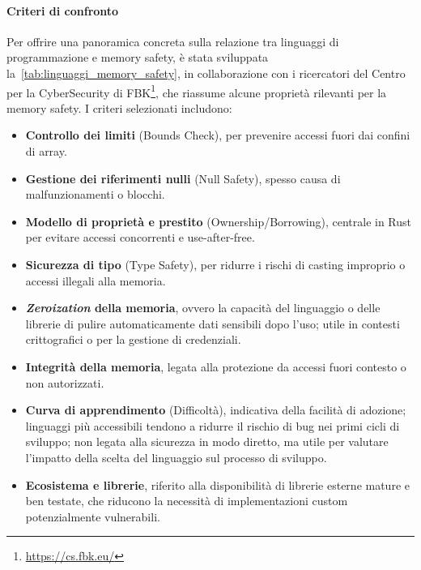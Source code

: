 \paragraph{Criteri di confronto}
Per offrire una panoramica concreta sulla relazione tra linguaggi di programmazione
e memory safety, è stata sviluppata la~\autoref{tab:linguaggi_memory_safety}, in
collaborazione con i ricercatori del Centro per la CyberSecurity di FBK\footnote{\url{https://cs.fbk.eu/}},
che riassume alcune proprietà rilevanti per la memory safety. I criteri
selezionati includono:
\begin{itemize}
  \item \textbf{Controllo dei limiti} (Bounds Check), per prevenire accessi fuori
    dai confini di array.

  \item \textbf{Gestione dei riferimenti nulli} (Null Safety), spesso causa di malfunzionamenti
    o blocchi.

  \item \textbf{Modello di proprietà e prestito} (Ownership/Borrowing), centrale
    in Rust per evitare accessi concorrenti e use-after-free.

  \item \textbf{Sicurezza di tipo} (Type Safety), per ridurre i rischi di casting
    improprio o accessi illegali alla memoria.

  \item \textbf{\textit{Zeroization} della memoria}, ovvero la capacità del linguaggio
    o delle librerie di pulire automaticamente dati sensibili dopo l'uso; utile
    in contesti crittografici o per la gestione di credenziali.

  \item \textbf{Integrità della memoria}, legata alla protezione da accessi fuori
    contesto o non autorizzati.

  \item \textbf{Curva di apprendimento} (Difficoltà), indicativa della facilità di
    adozione; linguaggi più accessibili tendono a ridurre il rischio di bug nei
    primi cicli di sviluppo; non legata alla sicurezza in modo diretto, ma utile
    per valutare l'impatto della scelta del linguaggio sul processo di sviluppo.

  \item \textbf{Ecosistema e librerie}, riferito alla disponibilità di librerie esterne
    mature e ben testate, che riducono la necessità di implementazioni custom
    potenzialmente vulnerabili.
\end{itemize}

